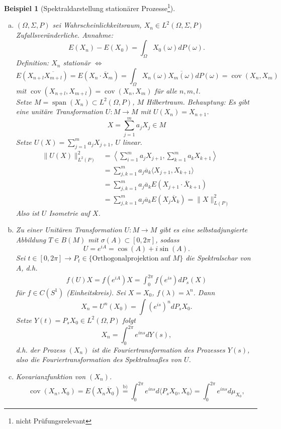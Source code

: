 \documentclass[12pt]{extreport} %
\newtheorem{Beispiel}[Satz]{Beispiel}
\DeclareMathOperator{\spann}{span}
\DeclareMathOperator{\cov}{cov}
\numberwithin{equation}{section}
\newcommand{\om}{\omega}
\newcommand{\m}{\cdot}
\begin{document}
	\begin{Beispiel}[Spektraldarstellung stationärer Prozesse\footnote{nicht Prüfungsrelevant}]
		\begin{enumerate}[a)]
		\item $(\Omega,\Sigma, P)$ sei Wahrscheinlichkeitsraum, $X_n\in L^2(\Omega,\Sigma, P)$ Zufallsveränderliche. Annahme: 
		$$E(X_n) - E(X_0) = \int_{\Omega} X_0(\om)dP(\om).$$
		Definition: $X_n$ stationär $\Leftrightarrow$ $$E(X_{n+l}\overline{X_{m+l}}) = E(X_n\m \overline X_m) = \int_{\Omega} X_n(\om) \overline{X_m(\om)}dP(\om) = \cov(X_n,X_m)$$
		mit $\cov(X_{n+l},X_{m+l}) = \cov(X_n,X_m)$ für alle $n,m,l$.\\
		Setze $M = \spann(X_n)\subset L^2(\Omega, P)$, $M$ Hilbertraum. Behauptung: Es gibt eine unitäre Transformation $U:M\rightarrow M$ mit $U(X_n) = X_{n+1}$.
		$$X = \sum_{j = 1}^{m}a_jX_j\in M$$
		Setze $U(X) = \sum_{j = 1}^{m}a_j X_{j+1}$, $U$ linear.
		\begin{align*}
			\|U(X)\|_{L^2(P)}^2 &= \left\langle \sum_{i=1}^{m}a_j X_{j+1}, \sum_{k = 1}^{m} a_kX_{k+1}\right\rangle \\
			&= \sum_{j,k = 1}^{m} a_j\overline{a}_k\langle X_{j+1},X_{k+1}\rangle \\
			&= \sum_{j,k = 1}^{m} a_j \overline{a}_k E(X_{j+1}\m \overline{X}_{k+1})\\
			&= \sum_{j,k = 1}^{m}a_j\overline{a}_k E(X_j\overline{X}_k) = \|X\|_{L(P)}^2
		\end{align*}
		Also ist $U$ Isometrie auf $X$.
		\item Zu einer Unitären Transformation $U:M\rightarrow M$ gibt es eine selbstadjungierte Abbildung $T\in B(M)$ mit $\sigma(A)\subset[0,2\pi]$, sodass
		$$U = e^{iA} = \cos(A)+i\sin(A).$$
		Sei $t\in[0,2\pi]\rightarrow P_t\in\{\text{Orthogonalprojektion auf }M\}$ die Spektralschar von $A$, d.h. 
		\begin{align*}
			f(U)X = f(e^{iA})X = \int_{0}^{2\pi} f(e^{is})dP_s(X)
		\end{align*}
		für $f\in C(S^1)$ (Einheitskreis). Sei $X = X_0$, $f(\lambda) = \lambda^n$. Dann
		$$X_n = U^n(X_0) = \int (e^{is})^n dP_sX_0.$$
		Setze $Y(t) = P_s X_0 \in L^2(\Omega,P)$ folgt
		$$X_n = \int_{0}^{2\pi} e^{ins} dY(s),$$
		d.h. der Prozess $(X_n)$ ist die Fouriertransformation des Prozesses $Y(s)$, also die Fouriertransformation des Spektralmaßes von $U$.
		\item Kovarianzfunktion von $(X_n)$. 
		$$\cov(X_n,X_0) = E(X_n\overline{X}_0)\overset{\text{b)}}{=} \int_{0}^{2\pi} e^{ins}d\langle P_s X_0,X_0\rangle = \int_{0}^{2\pi}e^{ins}d\mu_{X_0},$$

\end{enumerate}
\end{Beispiel}
\end{document}
